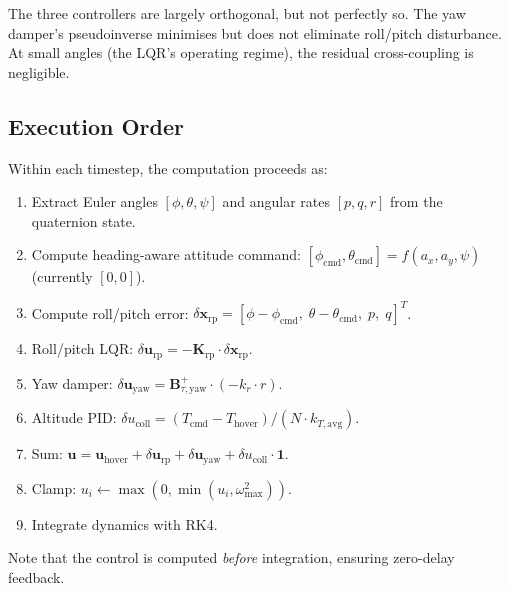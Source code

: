 \documentclass[12pt, a4paper]{article}
\newcommand{\bx}{\bm{x}}
\newcommand{\bu}{\bm{u}}
\newcommand{\bK}{\bm{K}}
\newcommand{\bB}{\bm{B}}
\begin{document}
The three controllers are largely orthogonal, but not perfectly so.  The yaw damper's pseudoinverse minimises but does not eliminate roll/pitch disturbance.  At small angles (the LQR's operating regime), the residual cross-coupling is negligible.

\subsection{Execution Order}

Within each timestep, the computation proceeds as:
\begin{enumerate}
    \item Extract Euler angles $[\phi, \theta, \psi]$ and angular rates $[p, q, r]$ from the quaternion state.
    \item Compute heading-aware attitude command: $[\phi_{\text{cmd}}, \theta_{\text{cmd}}] = f(a_x, a_y, \psi)$ (currently $[0, 0]$).
    \item Compute roll/pitch error: $\delta\bx_{\text{rp}} = [\phi - \phi_{\text{cmd}}, \; \theta - \theta_{\text{cmd}}, \; p, \; q]^T$.
    \item Roll/pitch LQR: $\delta\bu_{\text{rp}} = -\bK_{\text{rp}} \cdot \delta\bx_{\text{rp}}$.
    \item Yaw damper: $\delta\bu_{\text{yaw}} = \bB_{\tau,\text{yaw}}^+ \cdot (-k_r \cdot r)$.
    \item Altitude PID: $\delta u_{\text{coll}} = (T_{\text{cmd}} - T_{\text{hover}}) / (N \cdot k_{T,\text{avg}})$.
    \item Sum: $\bu = \bu_{\text{hover}} + \delta\bu_{\text{rp}} + \delta\bu_{\text{yaw}} + \delta u_{\text{coll}} \cdot \bm{1}$.
    \item Clamp: $u_i \leftarrow \max(0, \min(u_i, \omega_{\max}^2))$.
    \item Integrate dynamics with RK4.
\end{enumerate}

Note that the control is computed \emph{before} integration, ensuring zero-delay feedback.
\end{document}
